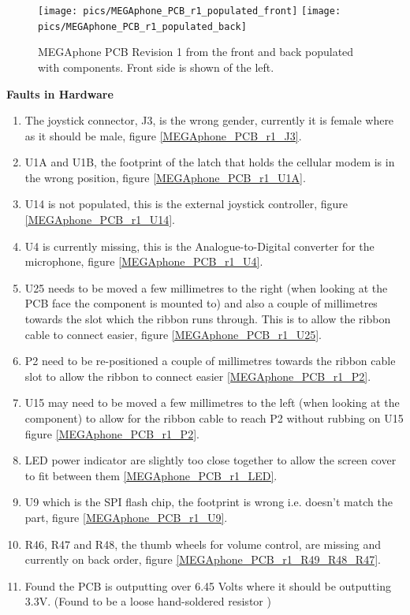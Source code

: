 \begin{figure} \begin{center}
\texttt{[image: pics/MEGAphone\_PCB\_r1\_populated\_front]} 
\texttt{[image: pics/MEGAphone\_PCB\_r1\_populated\_back]} 
\end{center} 
\caption{MEGAphone PCB Revision 1 from the front and back populated with components. Front side is shown of the left.\\}
\label{MEGAphone_PCB_r1_populated}
\end{figure}


\textbf{Faults in Hardware}
\begin{enumerate}
\item The joystick connector, J3, is the wrong gender, currently it is female where as it should be male, figure \ref{MEGAphone_PCB_r1_J3}.
\item U1A and U1B, the footprint of the latch that holds the cellular modem is in the wrong position, figure \ref{MEGAphone_PCB_r1_U1A}.
\item U14 is not populated, this is the external joystick controller, figure \ref{MEGAphone_PCB_r1_U14}. 
\item U4 is currently missing, this is the Analogue-to-Digital converter for the microphone, figure \ref{MEGAphone_PCB_r1_U4}.
\item U25 needs to be moved a few millimetres to the right (when looking at the PCB face the component is mounted to) and also a couple of millimetres towards the slot which the ribbon runs through. This is to allow the ribbon cable to connect easier, figure \ref{MEGAphone_PCB_r1_U25}.
\item P2 need to be re-positioned a couple of millimetres towards the ribbon cable slot to allow the ribbon to connect easier \ref{MEGAphone_PCB_r1_P2}.
\item U15 may need to be moved a few millimetres to the left (when looking at the component) to allow for the ribbon cable to reach P2 without rubbing on U15 figure \ref{MEGAphone_PCB_r1_P2}.
\item LED power indicator are slightly too close together to allow the screen cover to fit between them \ref{MEGAphone_PCB_r1_LED}.
\item U9 which is the SPI flash chip, the footprint is wrong i.e. doesn't match the part, figure \ref{MEGAphone_PCB_r1_U9}.
\item R46, R47 and R48, the thumb wheels for volume control, are missing and currently on back order, figure \ref{MEGAphone_PCB_r1_R49_R48_R47}.
\item Found the PCB is outputting over 6.45 Volts where it should be outputting 3.3V. (Found to be a loose hand-soldered resistor \cite{RN162}) \\
\end{enumerate}

